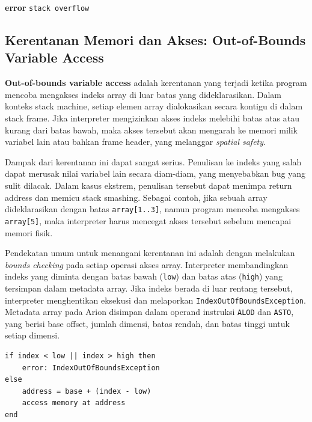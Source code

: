 \begin{breakablealgorithm}
    \label{alg:stack-validation}
    \begin{algorithmic}[1]
            \State \textbf{error} \texttt{stack overflow}
        \EndIf
        \EndProcedure
    \end{algorithmic}
\end{breakablealgorithm}

\subsection{Kerentanan Memori dan Akses: Out-of-Bounds Variable Access}

\textbf{Out-of-bounds variable access} adalah kerentanan yang terjadi ketika program mencoba mengakses indeks array di luar batas yang dideklarasikan. Dalam konteks stack machine, setiap elemen array dialokasikan secara kontigu di dalam stack frame. Jika interpreter mengizinkan akses indeks melebihi batas atas atau kurang dari batas bawah, maka akses tersebut akan mengarah ke memori milik variabel lain atau bahkan frame header, yang melanggar \textit{spatial safety}.

Dampak dari kerentanan ini dapat sangat serius. Penulisan ke indeks yang salah dapat merusak nilai variabel lain secara diam-diam, yang menyebabkan bug yang sulit dilacak. Dalam kasus ekstrem, penulisan tersebut dapat menimpa return address dan memicu stack smashing. Sebagai contoh, jika sebuah array dideklarasikan dengan batas \texttt{array[1..3]}, namun program mencoba mengakses \texttt{array[5]}, maka interpreter harus mencegat akses tersebut sebelum mencapai memori fisik.

Pendekatan umum untuk menangani kerentanan ini adalah dengan melakukan \textit{bounds checking} pada setiap operasi akses array. Interpreter membandingkan indeks yang diminta dengan batas bawah (\texttt{low}) dan batas atas (\texttt{high}) yang tersimpan dalam metadata array. Jika indeks berada di luar rentang tersebut, interpreter menghentikan eksekusi dan melaporkan \texttt{IndexOutOfBoundsException}. Metadata array pada Arion disimpan dalam operand instruksi \texttt{ALOD} dan \texttt{ASTO}, yang berisi base offset, jumlah dimensi, batas rendah, dan batas tinggi untuk setiap dimensi.

\begin{tcolorbox}[title=Contoh Bounds Checking pada Array Access,colback=gray!5,colframe=black!60,boxrule=0.5pt,arc=2mm]
\begin{verbatim}
if index < low || index > high then
    error: IndexOutOfBoundsException
else
    address = base + (index - low)
    access memory at address
end
\end{verbatim}
\end{tcolorbox}

